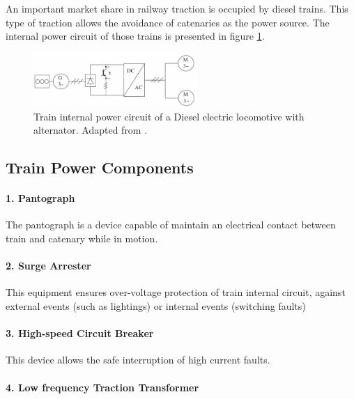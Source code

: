 An important market share in railway traction is occupied by diesel trains. This type of traction allows the avoidance of catenaries as the power source. The internal power circuit of those trains is presented in figure \ref{fig:abad2016h}.

\begin{figure}[h!]
	\centering
	\includegraphics[width=0.55\textwidth,keepaspectratio]{figures/31.PowerS/abad2016h}
	\caption{Train internal power circuit of a Diesel electric locomotive with alternator. Adapted from \cite{abad2016}.}
	\label{fig:abad2016h}
\end{figure}


\subsection{Train Power Components}
\label{subs:314}
\paragraph{1. Pantograph\\}

	The pantograph is a device capable of maintain an electrical contact between train and catenary while in motion.
	
\paragraph{2. Surge Arrester\\}

	This equipment ensures over-voltage protection of train internal circuit, against external events (such as lightings) or internal events (switching faults)
	
\paragraph{3. High-speed Circuit Breaker\\}
	
	This device allows the safe interruption of high current faults.
	
\paragraph{4. Low frequency Traction Transformer\\}
	
